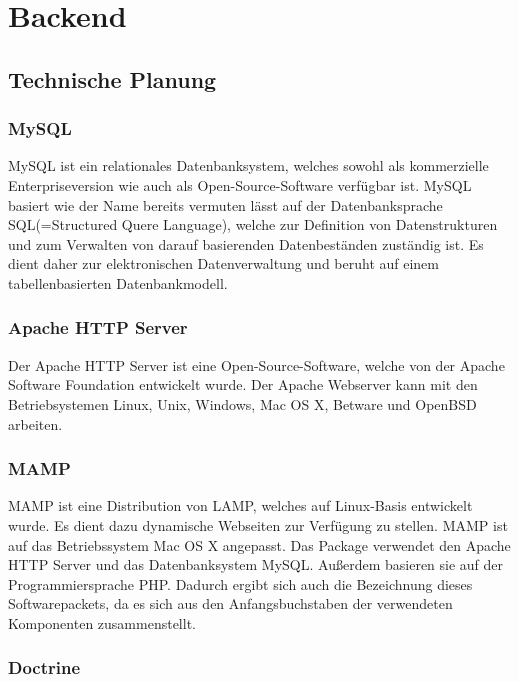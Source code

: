 \section{Backend}

  \subsection{Technische Planung}

    \subsubsection{MySQL}

MySQL ist ein relationales Datenbanksystem, welches sowohl als kommerzielle Enterpriseversion wie auch als Open-Source-Software verfügbar ist. MySQL basiert wie der Name bereits vermuten lässt auf der Datenbanksprache SQL(=Structured Quere Language), welche zur Definition von Datenstrukturen und zum Verwalten von darauf basierenden Datenbeständen zuständig ist. Es dient daher zur elektronischen Datenverwaltung und beruht auf einem tabellenbasierten Datenbankmodell.

    \subsubsection{Apache HTTP Server}

Der Apache HTTP Server ist eine Open-Source-Software, welche von der Apache Software Foundation entwickelt wurde. Der Apache Webserver kann mit den Betriebsystemen Linux, Unix, Windows, Mac OS X, Betware und OpenBSD arbeiten. 

    \subsubsection{MAMP}

MAMP ist eine Distribution von LAMP, welches auf Linux-Basis entwickelt wurde. Es dient dazu dynamische Webseiten zur Verfügung zu stellen. MAMP ist auf das Betriebssystem Mac OS X angepasst. Das Package verwendet den Apache HTTP Server und das Datenbanksystem MySQL. Außerdem basieren sie auf der Programmiersprache PHP. Dadurch ergibt sich auch die Bezeichnung dieses Softwarepackets, da es sich aus den Anfangsbuchstaben der verwendeten Komponenten zusammenstellt.

    \subsubsection{Doctrine}
    
